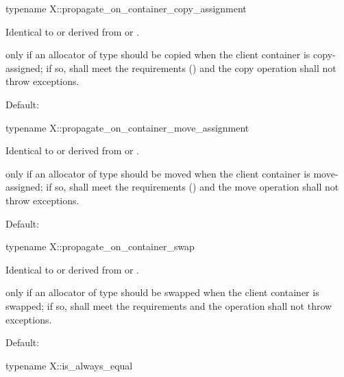 \begin{itemdecl}
typename X::propagate_on_container_copy_assignment
\end{itemdecl}

\begin{itemdescr}
\pnum
\result
Identical to or derived from  or .

\pnum
\returns
{} only if an allocator of type  should be copied
when the client container is copy-assigned;
if so,  shall meet
the  requirements () and
the copy operation shall not throw exceptions.

\pnum
\remarks
Default: 
\end{itemdescr}

\begin{itemdecl}
typename X::propagate_on_container_move_assignment
\end{itemdecl}

\begin{itemdescr}
\pnum
\result
Identical to or derived from  or .

\pnum
\returns
{} only if an allocator of type  should be moved
when the client container is move-assigned;
if so,  shall meet
the  requirements () and
the move operation shall not throw exceptions.

\pnum
\remarks
Default: 
\end{itemdescr}

\begin{itemdecl}
typename X::propagate_on_container_swap
\end{itemdecl}

\begin{itemdescr}
\pnum
\result
Identical to or derived from  or .

\pnum
\returns
{} only if an allocator of type  should be swapped
when the client container is swapped;
if so,
 shall meet the  requirements and
the  operation shall not throw exceptions.

\pnum
\remarks
Default: 
\end{itemdescr}

\begin{itemdecl}
typename X::is_always_equal
\end{itemdecl}

